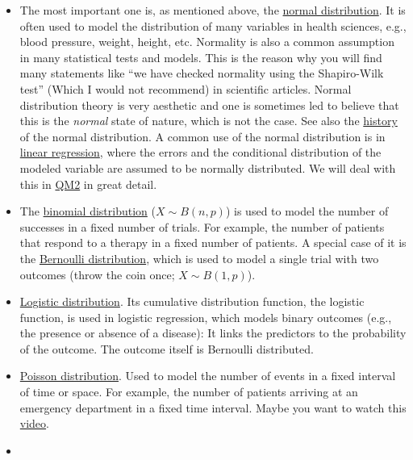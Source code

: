 \documentclass[
]{book}
\begin{document}
\begin{itemize}
\item
  The most important one is, as mentioned above, the \href{https://en.wikipedia.org/wiki/Normal_distribution}{normal distribution}.
  It is often used to model the distribution of many variables in health sciences, e.g., blood pressure, weight, height, etc.
  Normality is also a common assumption in many statistical tests and models. This is the reason why you will find many statements like
  ``we have checked normality using the Shapiro-Wilk test'' (Which I would not recommend) in scientific articles.
  Normal distribution theory is very aesthetic and one is sometimes led to believe that this is the \emph{normal} state of nature, which is
  not the case. See also the \href{https://en.wikipedia.org/wiki/Normal_distribution\#History}{history} of the normal distribution.
  A common use of the normal distribution is in \href{https://en.wikipedia.org/wiki/Linear_regression}{linear regression},
  where the errors and the conditional distribution of the modeled variable are assumed to be normally distributed.
  We will deal with this in \href{https://jdegenfellner.github.io/Script_QM2_ZHAW/}{QM2} in great detail.
\item
  The \href{https://en.wikipedia.org/wiki/Binomial_distribution}{binomial distribution} (\(X \sim B(n, p)\)) is used to model the number of successes in a fixed number of trials.
  For example, the number of patients that respond to a therapy in a fixed number of patients.
  A special case of it is the \href{https://en.wikipedia.org/wiki/Bernoulli_distribution}{Bernoulli distribution},
  which is used to model a single trial with two outcomes (throw the coin once; \(X \sim B(1,p)\)).
\item
  \href{https://en.wikipedia.org/wiki/Logistic_distribution}{Logistic distribution}. Its cumulative distribution function, the logistic function,
  is used in logistic regression, which models binary outcomes (e.g., the presence or absence of a disease):
  It links the predictors to the probability of the outcome. The outcome itself is Bernoulli distributed.
\item
  \href{https://en.wikipedia.org/wiki/Poisson_distribution}{Poisson distribution}. Used to model the number of events in a fixed interval of time or space.
  For example, the number of patients arriving at an emergency department in a fixed time interval.
  Maybe you want to watch this \href{https://www.youtube.com/watch?v=jmqZG6roVqU&ab_channel=jbstatistics}{video}.
\item

\end{itemize}
\end{document}
